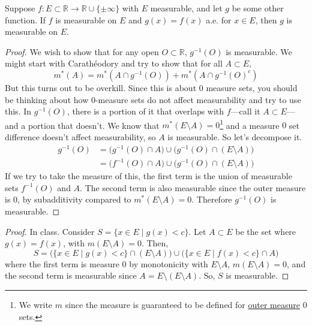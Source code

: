   \begin{theorem}
    \label{thm:function-difference-on-measure-0-set-doesnt}
    Suppose $f: E \subset \mathbb{R} \to \mathbb{R} \cup \{\pm \infty\}$ with $E$ measurable, and let $g$ be some other function. If $f$ is measurable on $E$ and $g(x) = f(x)$ a.e. for $x \in E$, then $g$ is measurable on $E$. 
  \end{theorem}
  \begin{proof}
    We wish to show that for any open $O \subset \mathbb{R}$, $g^{-1} (O)$ is measurable. We might start with Carathéodory and try to show that for all $A \subset E$, 
    \begin{equation}
      m^\ast(A) = m^\ast (A \cap g^{-1}(O)) + m^\ast (A \cap g^{-1}(O)^c)
    \end{equation}
    But this turns out to be overkill. Since this is about $0$ measure sets, you should be thinking about how $0$-measure sets do not affect measurability and try to use this. In $g^{-1}(O)$, there is a portion of it that overlaps with $f$---call it $A \subset E$---and a portion that doesn't. We know that $m^\ast (E \setminus A) = 0$\footnote{We write $m$ since the measure is guaranteed to be defined for \hyperref[def:outer-measure]{outer measure} $0$ sets. } and a measure $0$ set difference doesn't affect measurability, so $A$ is measurable. So let's decompose it. 
    \begin{align}
      g^{-1} (O) & = \big( g^{-1} (O) \cap A \big) \cup \big( g^{-1} (O) \cap (E \setminus A) \big) \\ 
                 & = \big( f^{-1} (O) \cap A \big) \cup \big( g^{-1} (O) \cap (E \setminus A) \big)
    \end{align}
    If we try to take the measure of this, the first term is the union of measurable sets $f^{-1} (O)$ and $A$. The second term is also measurable since the outer measure is $0$, by subadditivity compared to $m^\ast(E \setminus A) = 0$. Therefore $g^{-1} (O)$ is measurable. 
  \end{proof}
  \begin{proof}
    In class. Consider $S = \{x \in E \mid g(x) < c \}$. Let $A \subset E$ be the set where $g(x) = f(x)$, with $m (E \setminus A) = 0$. Then, 
    \begin{equation}
      S = \big( \{x \in E \mid g(x) < c\} \cap (E \setminus A) \big) \cup \big( \{x \in E \mid f(x) < c\} \cap A \big) 
    \end{equation}
    where the first term is measure $0$ by monotonicity with $E \setminus A$, $m(E \setminus A) = 0$, and the second term is measurable since $A = E \setminus (E \setminus A)$. So, $S$ is measurable. 
  \end{proof}

